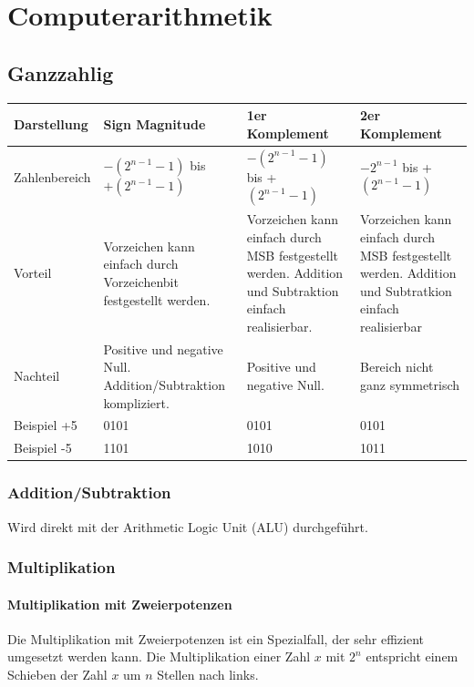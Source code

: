 \section{Computerarithmetik}

\subsection{Ganzzahlig}
\begin{tabular}{|p{3cm}|p{4.5cm}|p{4.5cm}|p{4.5cm}|}
	\hline
	Darstellung & Sign Magnitude & 1er Komplement & 2er Komplement\\
	\hline
	Zahlenbereich & $-(2^{n-1}-1)$ bis $+(2^{n-1}-1)$ & $-(2^{n-1}-1)$ bis +$(2^{n-1}-1)$ & $-2^{n-1}$ bis +$(2^{n-1}-1)$\\
	\hline
	Vorteil & Vorzeichen kann einfach durch Vorzeichenbit festgestellt werden. & Vorzeichen kann einfach durch MSB festgestellt werden. Addition und Subtraktion einfach realisierbar. & Vorzeichen kann einfach durch MSB festgestellt werden. Addition und Subtratkion einfach realisierbar \\
	\hline
	Nachteil & Positive und negative Null. Addition/Subtraktion kompliziert. & Positive und negative Null. & Bereich nicht ganz symmetrisch\\
	\hline
	Beispiel +5 & 0101 & 0101 & 0101 \\
	Beispiel -5 & 1101 & 1010 & 1011 \\
	\hline
\end{tabular}

\subsubsection{Addition/Subtraktion}
Wird direkt mit der Arithmetic Logic Unit (ALU) durchgeführt.

\subsubsection{Multiplikation}
\paragraph {Multiplikation mit Zweierpotenzen}
Die Multiplikation mit Zweierpotenzen ist ein Spezialfall, der sehr effizient umgesetzt werden kann. Die Multiplikation einer Zahl $x$ mit $2^n$ entspricht einem Schieben der Zahl $x$ um $n$ Stellen nach links.

